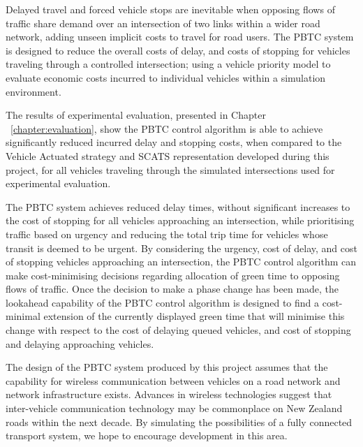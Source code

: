 Delayed travel and forced vehicle stops are inevitable when opposing flows of traffic share demand over an intersection of two links within a wider road network, adding unseen implicit costs to travel for road users. The PBTC system is designed to reduce the overall costs of delay, and costs of stopping for vehicles traveling through a controlled intersection; using a vehicle priority model to evaluate economic costs incurred to individual vehicles within a simulation environment.

The results of experimental evaluation, presented in Chapter ~\ref{chapter:evaluation}, show the PBTC control algorithm is able to achieve significantly reduced incurred delay and stopping costs, when compared to the Vehicle Actuated strategy and SCATS representation developed during this project, for all vehicles traveling through the simulated intersections used for experimental evaluation.

The PBTC system achieves reduced delay times, without significant increases to the cost of stopping for all vehicles approaching an intersection, while prioritising traffic based on urgency and reducing the total trip time for vehicles whose transit is deemed to be urgent. By considering the urgency, cost of delay, and cost of stopping vehicles approaching an intersection, the PBTC control algorithm can make cost-minimising decisions regarding allocation of green time to opposing flows of traffic. Once the decision to make a phase change has been made, the lookahead capability of the PBTC control algorithm is designed to find a cost-minimal extension of the currently displayed green time that will minimise this change with respect to the cost of delaying queued vehicles, and cost of stopping and delaying approaching vehicles.

The design of the PBTC system produced by this project assumes that the capability for wireless communication between vehicles on a road network and network infrastructure exists. Advances in wireless technologies suggest that inter-vehicle communication technology may be commonplace on New Zealand roads within the next decade. By simulating the possibilities of a fully connected transport system, we hope to encourage development in this area.




